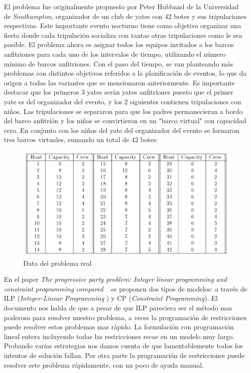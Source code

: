 \documentclass[letter, 10pt]{article}
\begin{document}
El problema fue originalmente propuesto por Peter Hubband de la Universidad de \textit{Southampton}, organizador de un club de yates con 42 botes y sus tripulaciones respectivas. Este importante evento nocturno tiene como objetivo organizar una fiesta donde cada tripulación socializa con tantas otras tripulaciones como le sea posible. El problema ahora es asignar todos los equipos invitados a los barcos anfitriones para cada uno de los intervalos de tiempo, utilizando el número mínimo de barcos anfitriones. Con el paso del tiempo, se van planteando más problemas con distintos objetivos referidos a la planificación de eventos, lo que da origen a todas las variantes que se mencionaron anteriormente. Es importante destacar que los primeros 3 yates serán yates anfitriones puesto que el primer yate es del organizador del evento, y los 2 siguientes contienen tripulaciones con niños. Las tripulaciones se separaron para que los padres permanecieran a bordo del
barco anfitrión y los niños se convirtieron en un "barco virtual" con capacidad cero. En conjunto con los niños del yate del organizador del evento se formaron tres barcos virtuales, sumando un total de 42 botes:

\begin{figure}[ht]
\centering
 \includegraphics[width=1.0\textwidth]{party5.png}
 \caption{Data del problema real}
\end{figure}

En el paper \textit{The progressive party problem: Integer linear programming and constraint programming compared} ~\cite{Smith1996} se proponen dos tipos de modelos: a través de ILP (\textit{Integer-Linear Programming} ) y CP (\textit{Constraint Programming}). El documento nos habla de que a pesar de que ILP pareciera ser el método mas poderoso para resolver nuestro problema, a veces la programación de restricciones puede resolver estos problemas mas rápido. La formulación con programación lineal entera incluyendo todas las restricciones recae en un modelo muy largo. Probando varias estrategias nos damos cuenta de que lamentablemente todos los intentos de solución fallan. Por otra parte la programación de restricciones puede resolver este problema rápidamente, con un poco de ayuda manual. 
\end{document}
